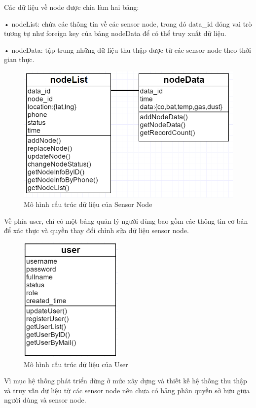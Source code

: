 Các dữ liệu về node được chia làm hai bảng:

• nodeList: chứa các thông tin về các sensor node, trong đó data\_id đóng vai trò tương tự như foreign key của bảng nodeData để có thể truy xuất dữ liệu.

• nodeData: tập trung những dữ liệu thu thập được từ các sensor node theo thời gian thực. 
\begin{figure}[H]
	\centering    
	\includegraphics[width=1.0\textwidth]{dbnode}
	\caption[Mô hình cấu trúc dữ liệu của Sensor Node]{Mô hình cấu trúc dữ liệu của Sensor Node}
	\label{fig: dbnode}
\end{figure}
Về phía user, chỉ có một bảng quản lý người dùng bao gồm các thông tin cơ bản để xác thực và quyền thay đổi chỉnh sửa dữ liệu sensor node.
\begin{figure}[H]
	\centering    
	\includegraphics[width=0.45\textwidth]{dbuser}
	\caption[Mô hình cấu trúc dữ liệu của User]{Mô hình cấu trúc dữ liệu của User}
	\label{fig: dbuser}
\end{figure}

Vì mục hệ thống phát triển dừng ở mức xây dựng và thiết kế hệ thống thu thập và truy vấn dữ liệu từ các sensor node nên chưa có bảng phân quyền sở hữu giữa người dùng và sensor node.
